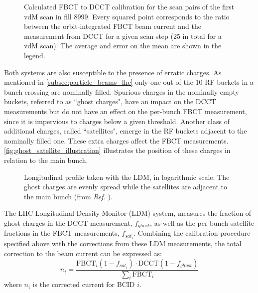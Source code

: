\begin{figure}[!htb]
	\centering
	\caption[FBCT calibration for scan pairs]{Calculated FBCT to DCCT calibration for the scan pairs of the first vdM scan in fill 8999. Every squared point corresponds to the ratio between the orbit-integrated FBCT beam current and the measurement from DCCT for a given scan step (25 in total for a vdM scan). The average and error on the mean are shown in the legend.}
	\label{fig:fbct_dcct_vdM1_calibration}
\end{figure}

Both systems are also susceptible to the presence of erratic charges. As mentioned in \autoref{subsec:particle_beams_lhc} only one out of the 10 RF buckets in a bunch crossing are nominally filled. Spurious charges in the nominally empty buckets, referred to as ``ghost charges", have an impact on the DCCT measurements but do not have an effect on the per-bunch FBCT measurement, since it is impervious to charges below a given threshold. Another class of additional charges, called ``satellites", emerge in the RF buckets adjacent to the nominally filled one. These extra charges affect the FBCT measurements. \autoref{fig:ghost_satellite_illustration} illustrates the position of these charges in relation to the main bunch. 

\begin{figure}[!htb]
	\centering
	\caption[Longitudinal bunch profile with LDM]{Longitudinal profile taken with the LDM, in logarithmic scale. The ghost charges are evenly spread while the satellites are adjacent to the main bunch (from \textit{Ref.} \cite{Alici:1427728}).}
	\label{fig:ghost_satellite_illustration}
\end{figure}

The LHC Longitudinal Density Monitor (LDM) system, measures the fraction of ghost charges in the DCCT measurement, $f_{ghost}$, as well as the per-bunch satellite fractions in the FBCT measurements, $f_{sat_i}$. Combining the calibration procedure specified above with the corrections from these LDM measurements, the total correction to the beam current can be expressed as:
\begin{equation}
	n_{i} = \frac{\mathrm{FBCT}_i \left( 1 - f_{sat_i} \right) \cdot \mathrm{DCCT} \left( 1 - f_{ghost} \right)}{\sum_i \mathrm{FBCT}_i}
\end{equation}
where $n_{i}$ is the corrected current for BCID $i$.

